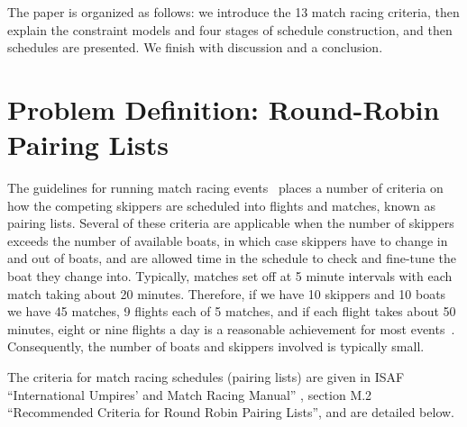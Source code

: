 \documentclass{llncs}
\begin{document}
The paper is organized as follows: we introduce the 13 match racing criteria, then explain the
constraint models and four stages of schedule construction, and then schedules are presented. We
finish with discussion and a conclusion.

\section{Problem Definition: Round-Robin Pairing Lists}\label{sec:definition}
The guidelines for running match racing events~\cite{isaf} places a number of criteria on how the
competing skippers are scheduled into flights and matches, known as pairing lists. Several of these
criteria are applicable when the number of skippers exceeds the number of available boats, in which
case skippers have to change in and out of boats, and are allowed time in the schedule to check and
fine-tune the boat they change into. Typically, matches set off at 5 minute intervals with each
match taking about 20 minutes. Therefore, if we have 10 skippers and 10 boats we have 45 matches,
9 flights each of 5 matches, and if each flight takes about 50 minutes,  eight or nine
flights a day is a reasonable achievement for most events~\cite{isaf}. Consequently, the number of
boats and skippers involved is typically small.

The criteria for  match racing schedules (pairing lists) are given in ISAF ``International Umpires'
and Match Racing Manual'' \cite{isaf}, section M.2 ``Recommended Criteria for Round Robin Pairing
Lists'', and are detailed below.
\end{document}
